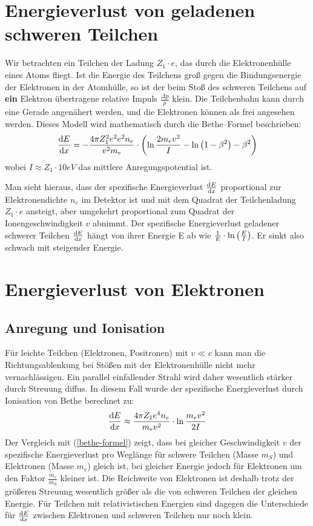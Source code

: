 \documentclass[Ex4_Zusammenfassung.tex]{subfiles}
\begin{document}
\section{Energieverlust von geladenen schweren Teilchen}
Wir betrachten ein Teilchen der Ladung $Z_1 \cdot e $, das durch die Elektronenhülle eines Atoms fliegt. Ist die Energie des Teilchens groß gegen die Bindungsenergie der Elektronen in der Atomhülle, so ist der beim Stoß des schweren Teilchens auf \textbf{ein} Elektron  übertragene relative Impuls $\frac{\Delta p}{p}$ klein. Die Teilchenbahn kann durch eine Gerade angenähert werden, und die Elektronen können als frei angesehen werden.
Dieses Modell wird mathematisch durch die Bethe--Formel beschrieben:
\begin{equation}\label{bethe-formel}
	\frac{\mathrm{d} E}{\mathrm{d} x} = - \frac{4 \pi Z_1^2 e^2 e^2 n_e}{v^2 m_e} \cdot \left( \ln \frac{2 m_e v^2}{I} - \ln \left( 1-\beta^2\right) - \beta^2 \right)
\end{equation}
wobei $I \approx Z_1\cdot 10\si{eV}$ das mittlere Anregungspotential ist.

Man sieht hieraus, dass der spezifische Energieverlust $\frac{\mathrm{d} E}{\mathrm{d} x}$ proportional zur Elektronendichte $n_e$ im Detektor ist und mit dem Quadrat der Teilchenladung $Z_1 \cdot e$ ansteigt, aber umgekehrt proportional zum Quadrat der Ionengeschwindigkeit $v$ abnimmt. Der spezifische Energieverlust geladener schwerer Teilchen $\frac{\mathrm{d} E}{\mathrm{d} x} $ hängt von ihrer Energie E ab wie $ \frac{1}{E} \cdot \ln \left( \frac{E}{I} \right) $. Er sinkt also schwach mit steigender Energie.

\section{Energieverlust von Elektronen}
\subsection{Anregung und Ionisation}
Für leichte Teilchen (Elektronen, Positronen) mit $v \ll c$ kann man die Richtungsablenkung bei Stößen mit der Elektronenhülle nicht mehr vernachlässigen. Ein parallel einfallender Strahl wird daher wesentlich stärker durch Streuung diffus. In diesem Fall wurde der spezifische Energieverlust durch Ionisation von Bethe berechnet zu: 
\begin{equation}
	\frac{\mathrm{d} E}{\mathrm{d} x} \approx \frac{4\pi Z_1 e^4 n_e }{m_e v^2} \cdot  \ln \frac{m_e v^2}{2 I }
\end{equation}
Der Vergleich mit (\ref{bethe-formel}) zeigt, dass bei gleicher Geschwindigkeit $v$ der spezifische Energieverlust pro Weglänge für schwere Teilchen (Masse $m_S$) und Elektronen (Masse $m_e$) gleich ist, bei gleicher Energie jedoch für Elektronen um den Faktor $\frac{m_e}{m_S} $ kleiner ist. Die Reichweite von Elektronen ist deshalb trotz der größeren Streuung wesentlich größer als die von schweren Teilchen der gleichen Energie. Für Teilchen mit relativistischen Energien sind dagegen die Unterschiede für $\frac{\mathrm{d} E}{\mathrm{d} x}$ zwischen Elektronen und schweren Teilchen nur noch klein. 
\end{document}
